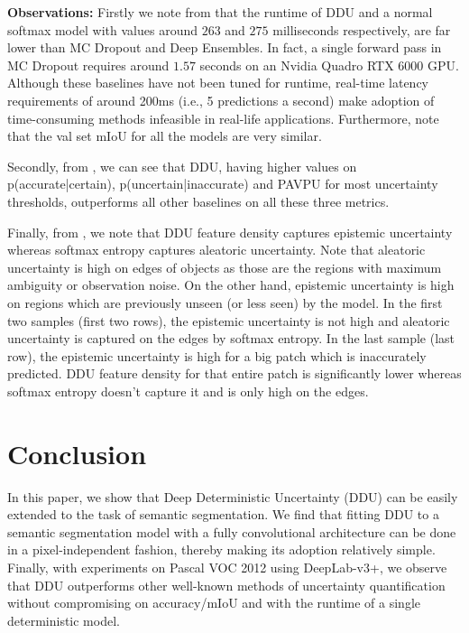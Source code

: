 \documentclass{article}
\begin{document}
\textbf{Observations: } Firstly we note from  that the runtime of DDU and a normal softmax model with values around $263$ and $275$ milliseconds respectively, are far lower than MC Dropout and Deep Ensembles. In fact, a single forward pass in MC Dropout requires around $1.57$ seconds on an Nvidia Quadro RTX 6000 GPU. Although these baselines have not been tuned for runtime, real-time latency requirements of around 200ms (i.e., 5 predictions a second) make adoption of time-consuming methods infeasible in real-life applications. Furthermore, note that the val set mIoU for all the models are very similar.

Secondly, from , we can see that DDU, having higher values on p(accurate|certain), p(uncertain|inaccurate) and PAVPU for most uncertainty thresholds, outperforms all other baselines on all these three metrics.

Finally, from , we note that DDU feature density captures epistemic uncertainty whereas softmax entropy captures aleatoric uncertainty. Note that aleatoric uncertainty is high on edges of objects as those are the regions with maximum ambiguity or observation noise. On the other hand, epistemic uncertainty is high on regions which are previously unseen (or less seen) by the model. In the first two samples (first two rows), the epistemic uncertainty is not high and aleatoric uncertainty is captured on the edges by softmax entropy. In the last sample (last row), the epistemic uncertainty is high for a big patch which is inaccurately predicted. DDU feature density for that entire patch is significantly lower whereas softmax entropy doesn't capture it and is only high on the edges.

\section{Conclusion}
\label{sec:conclusion}

In this paper, we show that Deep Deterministic Uncertainty (DDU) can be easily extended to the task of semantic segmentation. We find that fitting DDU to a semantic segmentation model with a fully convolutional architecture can be done in a pixel-independent fashion, thereby making its adoption relatively simple. Finally, with experiments on Pascal VOC 2012 using DeepLab-v3+, we observe that DDU outperforms other well-known methods of uncertainty quantification
%
without compromising on accuracy/mIoU and with the runtime of a single deterministic model.


%
%

%
%

%
%
%
%
%
%
%





\newpage
%
%
%
%
%
%
%

%
%
%
%

%
%
%
%

%
%
%
%
%
\end{document}
